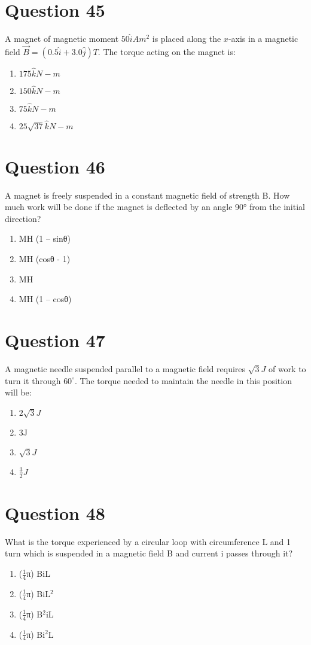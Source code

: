 \documentclass{article}
\begin{document}
\section*{Question 45}
A magnet of magnetic moment \(50 \hat{i} Am ^2\) is placed along the \(x\)-axis in a magnetic field \(\vec{B}=(0.5 \hat{i}+3.0 \hat{j}) T\). The torque acting on the magnet is:
\begin{enumerate}[label=(\alph*)]
\item \(175 \hat{k} N-m\)
\item \(150 \hat{k} N-m\)
\item \(75 \hat{k} N-m\)
\item \(25 \sqrt{37} \hat{k} N-m\)
\end{enumerate}
\newpage
\section*{Question 46}
A magnet is freely suspended in a constant magnetic field of strength B. How much work will be done if the magnet is deflected by an angle 90° from the initial direction?
\begin{enumerate}[label=(\alph*)]
\item MH (1 – sinθ)
\item MH (cosθ - 1)
\item MH
\item MH (1 – cosθ)
\end{enumerate}
\newpage
\section*{Question 47}
A magnetic needle suspended parallel to a magnetic field requires \(\sqrt{3} J\) of work to turn it through \(60^{\circ}\). The torque needed to maintain the needle in this position will be:
\begin{enumerate}[label=(\alph*)]
\item \(2 \sqrt{3} J\)
\item 3J
\item \(\sqrt{3} J\)
\item \(\frac{3 }{ 2 }J\)
\end{enumerate}
\newpage
\section*{Question 48}
What is the torque experienced by a circular loop with circumference L and 1 turn which is suspended in a magnetic field B and current i passes through it?
\begin{enumerate}[label=(\alph*)]
\item (\(\frac{1}{4}\)π) BiL
\item (\(\frac{1}{4}\)π) BiL$^{2}$
\item (\(\frac{1}{4}\)π) B$^{2}$iL
\item (\(\frac{1}{4}\)π) Bi$^{2}$L
\end{enumerate}
\newpage
\end{document}
